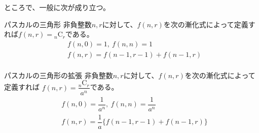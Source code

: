 \documentclass{article}
\begin{document}
ところで、一般に次が成り立つ。

\begin{itembox}[l]{パスカルの三角形}
    非負整数$n, r$に対して、$f(n, r)$を次の漸化式によって定義すれば$f(n, r) = {}_n \mathrm{C}_r$である。
    \begin{eqnarray*}
        &f(n, 0) = 1,\ f(n, n) = 1 \\
        &f(n, r) = f(n-1, r-1) + f(n-1, r) \\
    \end{eqnarray*}
\end{itembox}


\begin{itembox}[l]{パスカルの三角形の拡張}
    非負整数$n, r$に対して、$f(n, r)$を次の漸化式によって定義すれば
    $f(n, r) = \dfrac{{}_n \mathrm{C}_r}{a^n}$である。
    \begin{eqnarray*}
        &f(n, 0) = \dfrac{1}{a^n},\ f(n, n) = \dfrac{1}{a^n} \\
        &f(n, r) = \dfrac{1}{a} \{f(n-1, r-1) + f(n-1, r)\} \\
    \end{eqnarray*}
\end{itembox}

\end{document}
